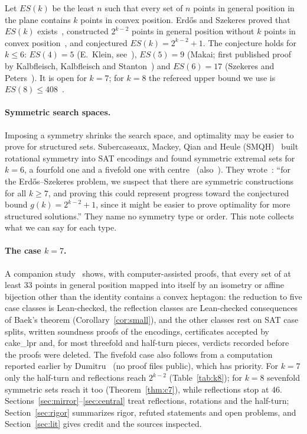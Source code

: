 \documentclass[10pt]{article}
\theoremstyle{definition}
\theoremstyle{remark}
\newcommand{\dirn}[1]{{\upshape\nolinkurl{#1}}}
\begin{document}
Let $ES(k)$ be the least $n$ such that every set of $n$ points in general position in the plane contains $k$ points in
convex position. Erd\H{o}s and Szekeres proved that $ES(k)$ exists~\cite{ES35}, constructed $2^{k-2}$ points in general
position without $k$ points in convex position~\cite{ES61}, and conjectured $ES(k)=2^{k-2}+1$. The conjecture holds for
$k\le6$: $ES(4)=5$ (E.~Klein, see~\cite{ES35}), $ES(5)=9$ (Makai; first published proof by Kalbfleisch, Kalbfleisch and
Stanton~\cite{KKS70}) and $ES(6)=17$ (Szekeres and Peters~\cite{SP06}). It is open for $k=7$; for $k=8$ the refereed
upper bound we use is $ES(8)\le408$~\cite{MV16}.

\paragraph{Symmetric search spaces.}
Imposing a symmetry shrinks the search space, and optimality may be easier to prove for structured sets.
Subercaseaux, Mackey, Qian and Heule (SMQH)~\cite{SMQH25} built rotational symmetry into SAT encodings and found
symmetric extremal sets for $k=6$, a fourfold one and a fivefold one with centre~\cite[App.~C, Tables~1--2]{SMQH25}
(also~\cite[Figs.~3.28, 3.33]{Mac25}). They wrote~\cite[\S7]{SMQH25}: ``for the Erd\H{o}s--Szekeres problem, we suspect
that there are symmetric constructions for all $k\ge7$, and proving this could represent progress toward the conjectured
bound $g(k)=2^{k-2}+1$, since it might be easier to prove optimality for more structured solutions.'' They name no
symmetry type or order. This note collects what we can say for each type.

\paragraph{The case $k=7$.}
A companion study~\cite[\dirn{WRITEUP/SYMMETRIC.md}]{Supp} shows, with computer-assisted proofs, that every set of at
least $33$ points in general position mapped into itself by an isometry or affine bijection other than the identity
contains a convex heptagon: the reduction to five case classes is Lean-checked, the reflection classes are Lean-checked
consequences of Baek's theorem (Corollary~\ref{cor:small}), and the other classes rest on SAT case splits, written
soundness proofs of the encodings, certificates accepted by cake\_lpr and, for most threefold and half-turn pieces,
verdicts recorded before the proofs were deleted. The fivefold case also follows from a computation
reported earlier by Dumitru~\cite[\S7, Table~1]{Dum25} (no proof files public), which has priority. For $k=7$ only the half-turn and reflections reach
$2^{k-2}$ (Table~\ref{tab:k8}); for $k=8$ sevenfold symmetric sets reach it too (Theorem~\ref{thm:c7}), while reflections
stop at $46$. Sections~\ref{sec:mirror}--\ref{sec:central} treat reflections, rotations and the half-turn;
Section~\ref{sec:rigor} summarizes rigor, refuted statements and open problems, and Section~\ref{sec:lit} gives credit
and the sources inspected.
\end{document}
